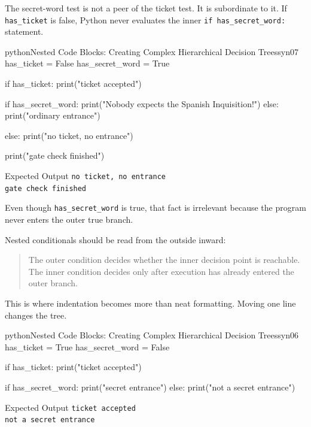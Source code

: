 \documentclass[a4paper,twoside]{report}
\begin{document}
The secret-word test is not a peer of the ticket test. It is subordinate to it. If \texttt{has\_ticket} is false, Python never evaluates the inner \texttt{if has\_secret\_word:} statement.

\begin{codebox}[]{python}{Nested Code Blocks: Creating Complex Hierarchical Decision Trees}{syn07}
has_ticket = False
has_secret_word = True

if has_ticket:
    print("ticket accepted")

    if has_secret_word:
        print("Nobody expects the Spanish Inquisition!")
    else:
        print("ordinary entrance")

else:
    print("no ticket, no entrance")

print("gate check finished")
\end{codebox}


\begin{iobox}{Expected Output}
\texttt{no ticket, no entrance} \\
\texttt{gate check finished} \\
\end{iobox}


Even though \texttt{has\_secret\_word} is true, that fact is irrelevant because the program never enters the outer true branch.

Nested conditionals should be read from the outside inward:

\begin{quote}
The outer condition decides whether the inner decision point is reachable. The inner condition decides only after execution has already entered the outer branch.
\end{quote}

This is where indentation becomes more than neat formatting. Moving one line changes the tree.

\begin{codebox}[]{python}{Nested Code Blocks: Creating Complex Hierarchical Decision Trees}{syn06}
has_ticket = True
has_secret_word = False

if has_ticket:
    print("ticket accepted")

if has_secret_word:
    print("secret entrance")
else:
    print("not a secret entrance")
\end{codebox}


\begin{iobox}{Expected Output}
\texttt{ticket accepted} \\
\texttt{not a secret entrance} \\
\end{iobox}
\end{document}
